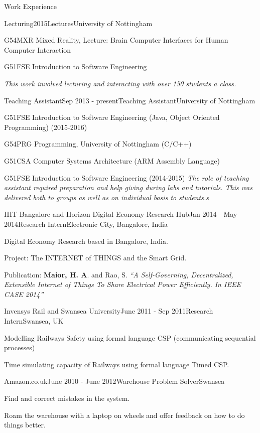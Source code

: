 \documentclass{resume} %
\begin{document}
\begin{rSection}{Work Experience}
    \begin{rSubsection}{Lecturing}{2015}{Lectures}{University of Nottingham}
        \item G54MXR Mixed Reality, Lecture: Brain Computer Interfaces for Human Computer Interaction
        \item G51FSE Introduction to Software Engineering
        \item \emph{This work involved lecturing and interacting with over 150 students a class.}
    \end{rSubsection}

    \begin{rSubsection}{Teaching Assistant}{Sep 2013 - present}{Teaching Assistant}{University of Nottingham}
        \item G51FSE Introduction to Software Engineering (Java, Object Oriented Programming) (2015-2016)
        \item G54PRG Programming, University of Nottingham (C/C++)
        \item G51CSA Computer Systems Architecture (ARM Assembly Language)
        \item G51FSE Introduction to Software Engineering (2014-2015)
        \emph{The role of teaching assistant required preparation and help giving during labs and tutorials. This was delivered both to groups as well as on individual basis to students.s}
    \end{rSubsection}
    
    \begin{rSubsection}{IIIT-Bangalore and Horizon Digital Economy Research Hub}{Jan 2014 - May 2014}{Research Intern}{Electronic City, Bangalore, India}
    \item Digital Economy Research based in Bangalore, India.
    \item Project: The INTERNET of THINGS and the Smart Grid.
    \item Publication: \textbf{Maior, H. A}. and Rao, S.  \emph{``A Self-Governing, Decentralized, Extensible Internet of Things To Share Electrical Power Efficiently. In IEEE CASE 2014''}
    \end{rSubsection}
    \begin{rSubsection}{Invensys Rail and Swansea University}{June 2011 - Sep 2011}{Research Intern}{Swansea, UK}
    \item Modelling Railways Safety using formal language CSP (communicating sequential processes)
    \item Time simulating capacity of Railways using formal language Timed CSP.
    \end{rSubsection}
    
        \begin{rSubsection}{Amazon.co.uk}{June 2010 - June 2012}{Warehouse Problem Solver}{Swansea}
        \item  Find and correct mistakes in the system.
        \item  Roam the warehouse with a laptop on wheels and offer feedback on how to do things better.
    \end{rSubsection}
    \end{rSection}
    
\end{document}
